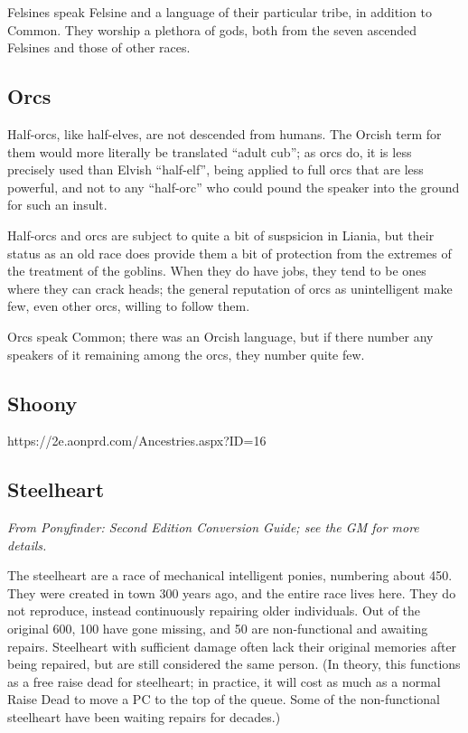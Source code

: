 \documentclass{report}
\begin{document}
Felsines speak Felsine and a language of their particular tribe, in addition to
Common. They worship a plethora of gods, both from the seven ascended Felsines
and those of other races.

\subsection{Orcs}

Half-orcs, like half-elves, are not descended from humans. The Orcish term for
them would more literally be translated ``adult cub''; as orcs do, it is less
precisely used than Elvish ``half-elf'', being applied to full orcs that are less powerful, and not to
any ``half-orc'' who could pound the speaker into the ground for such an insult.

Half-orcs and orcs are subject to quite a bit of suspsicion in Liania, but their
status as an old race does provide them a bit of protection from the extremes
of the treatment of the goblins. When they do have jobs, they tend to be ones
where they can crack heads; the general reputation of orcs as unintelligent
make few, even other orcs, willing to follow them.

Orcs speak Common; there was an Orcish language, but if there number any speakers
of it remaining among the orcs, they number quite few.

\subsection{Shoony}

https://2e.aonprd.com/Ancestries.aspx?ID=16


\subsection{Steelheart}

\emph{From \emph{Pony\-finder: Second Edition Conversion Guide}; see the GM
for more details.}

The steelheart are a race of mechanical intelligent ponies, numbering about 450.
They were created in town 300 years ago, and the entire race lives here. They
do not reproduce, instead continuously repairing older individuals. Out of the
original 600, 100 have gone missing, and 50 are non-functional and awaiting
repairs. Steelheart with sufficient damage often lack their original memories
after being repaired, but are still considered the same person. (In theory,
this functions as a free raise dead for steelheart; in practice, it will
cost as much as a normal Raise Dead to move a PC to the top of the queue. Some
of the non-functional steelheart have been waiting repairs for decades.)
\end{document}
